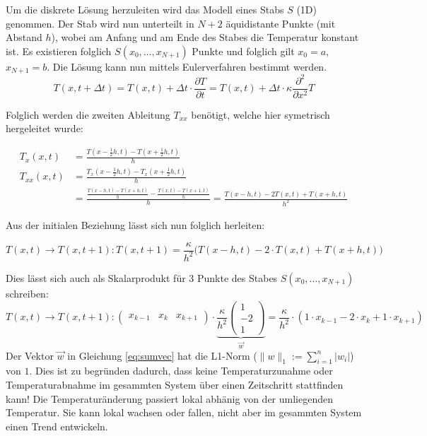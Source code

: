 Um die diskrete Lösung herzuleiten wird das Modell eines Stabs $S$ (1D) genommen. Der Stab wird nun unterteilt in $N+2$ äquidistante Punkte (mit Abstand $h$), wobei am Anfang und am Ende des Stabes die Temperatur konstant ist. Es existieren folglich $S(x_0, \dots, x_{N+1})$ Punkte und folglich gilt $x_0 = a$, $x_{N+1} = b$. Die Lösung kann nun mittels Eulerverfahren bestimmt werden.
\begin{equation}
T(x,t+\Delta t) = T(x,t) + \Delta t \cdot  \frac{\partial T}{\partial t} = T(x,t) + \Delta t \cdot \kappa \frac{\partial^2}{\partial x^2} T
\end{equation}

Folglich werden die zweiten Ableitung $T_{xx}$ benötigt, welche hier symetrisch hergeleitet wurde:

\begin{align}
T_{x}(x, t)  &= \frac{T(x-\frac{1}{2}h, t) - T(x+\frac{1}{2}h, t)}{h}\\
T_{xx}(x, t) &= \frac{T_{x}(x-\frac{1}{2}h, t) - T_{x}(x+\frac{1}{2}h, t)}{h} \\
&= \frac{\frac{T(x-h, t) - T(x+h, t)}{h} - \frac{T(x, t) - T(x+1,t)}{h}}{h} = \frac{T(x-h, t) - 2 T(x, t) + T(x+h, t)}{h^{2}}
\end{align}

Aus der initialen Beziehung lässt sich nun folglich herleiten:

\begin{equation}
T(x,t) \rightarrow T(x,t+1) : T(x,t+1) = \frac{\kappa}{h^{2}} \Big( T(x-h,t) - 2 \cdot T(x,t) + T(x+h,t)  \Big)
\end{equation}

Dies lässt sich auch als Skalarprodukt für 3 Punkte des Stabes $S(x_0, \dots, x_{N+1})$ schreiben: 
\begin{equation}
T(x,t) \rightarrow T(x,t+1) : \begin{pmatrix} x_{k-1} & x_{k} & x_{k+1} \end{pmatrix} \cdot \underbrace{\frac{\kappa}{h^2} \begin{pmatrix} 1 \\ -2 \\ 1 \end{pmatrix}}_{\vec{w}} =  \frac{\kappa}{h^2} \cdot \left( 1 \cdot x_{k-1} - 2 \cdot x_{k} + 1 \cdot x_{k+1} \right)
\label{eq:sumvec}
\end{equation}
Der Vektor $\vec{w}$ in Gleichung \ref{eq:sumvec} hat die L1-Norm ($\|w\|_{1}:=\sum _{{i=1}}^{n}|w_{i}|$) von $1$. Dies ist zu begründen dadurch, dass keine Temperaturzunahme oder Temperaturabnahme im gesammten System über einen Zeitschritt stattfinden kann! Die Temperaturänderung passiert lokal abhänig von der umliegenden Temperatur. Sie kann lokal wachsen oder fallen, nicht aber im gesammten System einen Trend entwickeln.

